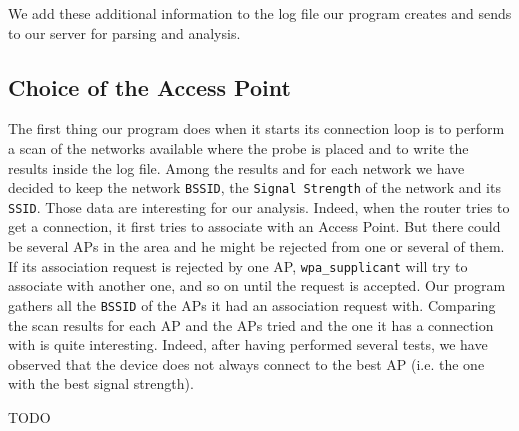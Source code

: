 We add these additional information to the log file our program creates and sends to our server for parsing and analysis.

\subsection{Choice of the Access Point}
The first thing our program does when it starts its connection loop is to perform a scan of the networks available where the probe is placed and to write the results inside the log file. Among the results and for each network we have decided to keep the network \texttt{BSSID}, the \texttt{Signal Strength} of the network and its \texttt{SSID}. Those data are interesting for our analysis. Indeed, when the router tries to get a connection, it first tries to associate with an Access Point. But there could be several APs in the area and he might be rejected from one or several of them. If its association request is rejected by one AP, \texttt{wpa\_supplicant} will try to associate with another one, and so on until the request is accepted. Our program gathers all the \texttt{BSSID} of the APs it had an association request with. 
Comparing the scan results for each AP and the APs tried and the one it has a connection with is quite interesting. Indeed, after having performed several tests, we have observed that the device does not always connect to the best AP (i.e. the one with the best signal strength).




TODO
